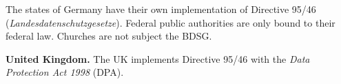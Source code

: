 The states of Germany have their own implementation of Directive 95/46 (\emph{Landesdatenschutzgesetze}).
Federal public authorities are only bound to their federal law.
Churches are not subject the BDSG.

\textbf{United Kingdom.}
The UK implements Directive 95/46 with the \emph{Data Protection Act 1998} (DPA).







